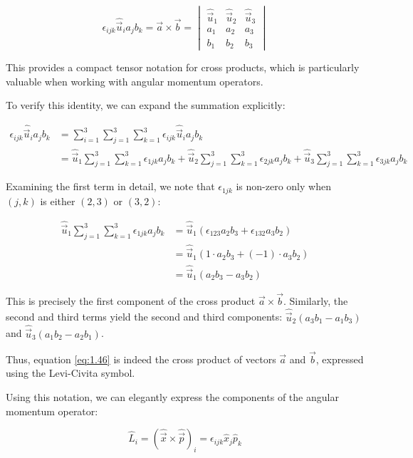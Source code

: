 \documentclass[italian]{HKNdocument}
\begin{document}
\[
\epsilon_{i j k} \hat{\vec{u}}_{i} a_{j} b_{k}=\vec{a} \times \vec{b}=\begin{vmatrix}
\hat{\vec{u}}_{1} & \hat{\vec{u}}_{2} & \hat{\vec{u}}_{3} \label{eq:1.46}\\
a_{1} & a_{2} & a_{3} \\
b_{1} & b_{2} & b_{3}
\end{vmatrix}
\]

This provides a compact tensor notation for cross products, which is particularly valuable when working with angular momentum operators.

To verify this identity, we can expand the summation explicitly:


\begin{align}
\epsilon_{i j k} \hat{\vec{u}}_{i} a_{j} b_{k} &= \sum_{i=1}^{3} \sum_{j=1}^{3} \sum_{k=1}^{3} \epsilon_{i j k} \hat{\vec{u}}_{i} a_{j} b_{k} \\
&= \hat{\vec{u}}_{1} \sum_{j=1}^{3} \sum_{k=1}^{3} \epsilon_{1 j k} a_{j} b_{k} + \hat{\vec{u}}_{2} \sum_{j=1}^{3} \sum_{k=1}^{3} \epsilon_{2 j k} a_{j} b_{k} + \hat{\vec{u}}_{3} \sum_{j=1}^{3} \sum_{k=1}^{3} \epsilon_{3 j k} a_{j} b_{k}
\end{align}

Examining the first term in detail, we note that $\epsilon_{1jk}$ is non-zero only when $(j,k)$ is either $(2,3)$ or $(3,2)$:

\begin{align}
\hat{\vec{u}}_{1} \sum_{j=1}^{3} \sum_{k=1}^{3} \epsilon_{1 j k} a_{j} b_{k} &= \hat{\vec{u}}_{1}(\epsilon_{123} a_{2} b_{3} + \epsilon_{132} a_{3} b_{2})  \\
&= \hat{\vec{u}}_{1}(1 \cdot a_{2} b_{3} + (-1) \cdot a_{3} b_{2}) \\
&= \hat{\vec{u}}_{1}(a_{2} b_{3} - a_{3} b_{2})
\end{align}

This is precisely the first component of the cross product $\vec{a} \times \vec{b}$. Similarly, the second and third terms yield the second and third components:
$\hat{\vec{u}}_{2}(a_{3} b_{1} - a_{1} b_{3})$ and $\hat{\vec{u}}_{3}(a_{1} b_{2} - a_{2} b_{1})$.

Thus, equation \eqref{eq:1.46} is indeed the cross product of vectors $\vec{a}$ and $\vec{b}$, expressed using the Levi-Civita symbol.

Using this notation, we can elegantly express the components of the angular momentum operator:

\begin{equation}
\hat{L}_{i} = (\hat{\vec{x}} \times \hat{\vec{p}})_{i} = \epsilon_{i j k} \hat{x}_{j} \hat{p}_{k}
\end{equation}
\end{document}
